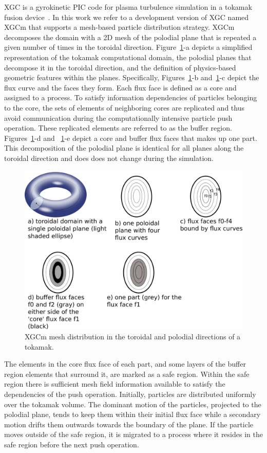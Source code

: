 \documentclass[conference]{IEEEtran}
\begin{document}
XGC is a gyrokinetic PIC code for plasma turbulence simulation in a tokamak
fusion device~\cite{chang2004numerical,Ku2016467,ku2009}.
In this work we refer to a development version of XGC named XGCm that supports
a mesh-based particle distribution strategy.
XGCm decomposes the domain with a 2D mesh of the
polodial plane that is repeated a given number of times in the toroidal direction.
Figure~\ref{fig:xgcmPtn}-a depicts a simplified representation of the tokamak computational
domain, the polodial planes that decompose it in the toroidal direction, and the
definition of physics-based geometric features within the planes.
Specifically, Figures~\ref{fig:xgcmPtn}-b and~\ref{fig:xgcmPtn}-c depict the
flux curve and the faces they form. Each flux face is defined as a core and
assigned to a process.
To satisfy information dependencies of particles belonging to the core, the sets
of elements of neighboring cores are replicated and thus avoid communication
during the computationally intensive particle push operation.
These replicated elements are referred to as the buffer region.
Figures~\ref{fig:xgcmPtn}-d and ~\ref{fig:xgcmPtn}-e depict a core and buffer
flux faces that makes up one part. 
This decomposition of the polodial plane is identical for all planes along the
toroidal direction and does does not change during the simulation.

\begin{figure}[!ht]
  \centering
  \includegraphics[width=.4\textwidth]{../figures/xgcm_partition.png}
  \caption{XGCm mesh distribution in the toroidal and polodial directions of a tokamak.}
  \label{fig:xgcmPtn}
\end{figure}

The elements in the core flux face of each part, and some layers of the
buffer region elements that surround it, are marked as a safe region.
Within the safe region there is sufficient mesh field information available to
satisfy the dependencies of the push operation.
Initially, particles are distributed uniformly over the tokamak volume.
The dominant motion of the particles, projected to the polodial plane, tends to
keep them within their initial flux face while a secondary motion drifts them
outwards towards the boundary of the plane.
If the particle moves outside of the safe region, it is migrated to a process
where it resides in the safe region before the next push operation.
\end{document}
